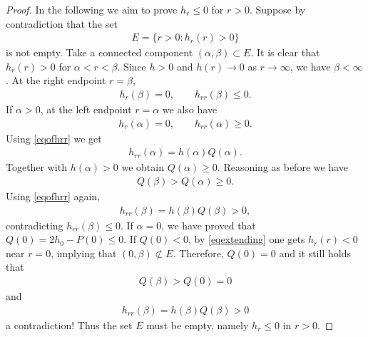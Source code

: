 \documentclass{article}
\theoremstyle{definition} \theoremstyle{remark}
\numberwithin{equation}{section}
\begin{document}
\begin{proof}
		In the following we aim to prove $h_r \le 0$ for $r > 0$. Suppose by contradiction that the set
		\begin{align*}
			E = \big\{r > 0: h_r(r) > 0\big\}
		\end{align*}
		is not empty. Take a connected component $(\alpha,\beta) \subset E$. It is clear that $h_r(r) > 0$ for $\alpha < r < \beta$. Since $h > 0$ and $h(r) \to 0$ as $r \to \infty$, we have $\beta < \infty$. At the right endpoint $r = \beta$,
		\begin{align*}
			h_r(\beta) = 0, \quad\quad h_{rr}(\beta) \le 0.
		\end{align*}
		If $\alpha > 0$, at the left endpoint $r = \alpha$ we also have
		\begin{align*}
			h_r(\alpha) = 0, \quad\quad h_{rr}(\alpha) \ge 0.
		\end{align*}
		Using \eqref{eqofhrr} we get
		\begin{align*}
			h_{rr}(\alpha) = h(\alpha)Q(\alpha).
		\end{align*}
		Together with $h(\alpha) > 0$ we obtain $Q(\alpha) \ge 0$. Reasoning as before we have
		\begin{align*}
			Q(\beta) > Q(\alpha) \ge 0.
		\end{align*}
		Using \eqref{eqofhrr} again,
		\begin{align*}
			h_{rr}(\beta) = h(\beta)Q(\beta) > 0,
		\end{align*}
		contradicting $h_{rr}(\beta) \le 0$. If $\alpha = 0$, we have proved that $Q(0) = 2h_0 - P(0) \le 0$. If $Q(0) < 0$, by \eqref{eqextending} one gets $h_r(r) < 0$ near $r = 0$, implying that $(0,\beta) \not\subset E$. Therefore, $Q(0) = 0$ and it still holds that
		\begin{align*}
			Q(\beta) > Q(0) = 0
		\end{align*}
		and
		\begin{align*}
			h_{rr}(\beta) = h(\beta)Q(\beta) > 0
		\end{align*}
		a contradiction! Thus the set $E$ must be empty, namely $h_r \le 0$ in $r > 0$.


\end{proof}
\end{document}
